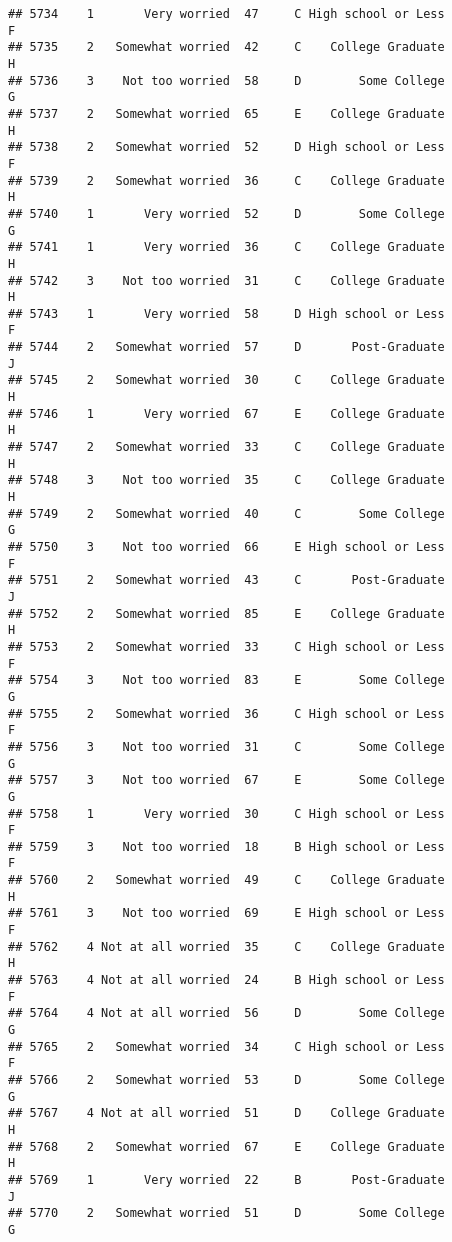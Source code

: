 \documentclass[
]{article}
\begin{document}
\begin{verbatim}
## 5734    1       Very worried  47     C High school or Less         F
## 5735    2   Somewhat worried  42     C    College Graduate         H
## 5736    3    Not too worried  58     D        Some College         G
## 5737    2   Somewhat worried  65     E    College Graduate         H
## 5738    2   Somewhat worried  52     D High school or Less         F
## 5739    2   Somewhat worried  36     C    College Graduate         H
## 5740    1       Very worried  52     D        Some College         G
## 5741    1       Very worried  36     C    College Graduate         H
## 5742    3    Not too worried  31     C    College Graduate         H
## 5743    1       Very worried  58     D High school or Less         F
## 5744    2   Somewhat worried  57     D       Post-Graduate         J
## 5745    2   Somewhat worried  30     C    College Graduate         H
## 5746    1       Very worried  67     E    College Graduate         H
## 5747    2   Somewhat worried  33     C    College Graduate         H
## 5748    3    Not too worried  35     C    College Graduate         H
## 5749    2   Somewhat worried  40     C        Some College         G
## 5750    3    Not too worried  66     E High school or Less         F
## 5751    2   Somewhat worried  43     C       Post-Graduate         J
## 5752    2   Somewhat worried  85     E    College Graduate         H
## 5753    2   Somewhat worried  33     C High school or Less         F
## 5754    3    Not too worried  83     E        Some College         G
## 5755    2   Somewhat worried  36     C High school or Less         F
## 5756    3    Not too worried  31     C        Some College         G
## 5757    3    Not too worried  67     E        Some College         G
## 5758    1       Very worried  30     C High school or Less         F
## 5759    3    Not too worried  18     B High school or Less         F
## 5760    2   Somewhat worried  49     C    College Graduate         H
## 5761    3    Not too worried  69     E High school or Less         F
## 5762    4 Not at all worried  35     C    College Graduate         H
## 5763    4 Not at all worried  24     B High school or Less         F
## 5764    4 Not at all worried  56     D        Some College         G
## 5765    2   Somewhat worried  34     C High school or Less         F
## 5766    2   Somewhat worried  53     D        Some College         G
## 5767    4 Not at all worried  51     D    College Graduate         H
## 5768    2   Somewhat worried  67     E    College Graduate         H
## 5769    1       Very worried  22     B       Post-Graduate         J
## 5770    2   Somewhat worried  51     D        Some College         G

\end{verbatim}
\end{document}
